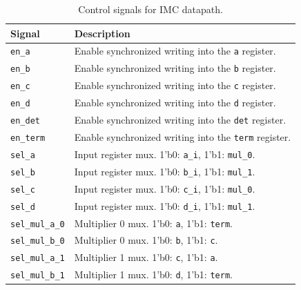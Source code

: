 \documentclass[../main.tex]{subfiles}
\begin{document}
\begin{table}[h]
    \centering
    \renewcommand{\arraystretch}{1.2}
    \setlength{\tabcolsep}{8pt}

    \begin{tabularx}{\textwidth}{@{}lX@{}}
        \toprule
        \textbf{Signal} & \textbf{Description} \\
        \midrule
        \texttt{en\_a}          & Enable synchronized writing into the \texttt{a} register. \\
        \texttt{en\_b}          & Enable synchronized writing into the \texttt{b} register. \\
        \texttt{en\_c}          & Enable synchronized writing into the \texttt{c} register. \\
        \texttt{en\_d}          & Enable synchronized writing into the \texttt{d} register. \\
        \texttt{en\_det}        & Enable synchronized writing into the \texttt{det} register. \\
        \texttt{en\_term}       & Enable synchronized writing into the \texttt{term} register. \\
        \texttt{sel\_a}         & Input register mux. 1'b0: \texttt{a\_i}, \hspace{20pt} 1'b1: \texttt{mul\_0}. \\
        \texttt{sel\_b}         & Input register mux. 1'b0: \texttt{b\_i}, \hspace{20pt} 1'b1: \texttt{mul\_1}. \\
        \texttt{sel\_c}         & Input register mux. 1'b0: \texttt{c\_i}, \hspace{20pt} 1'b1: \texttt{mul\_0}. \\
        \texttt{sel\_d}         & Input register mux. 1'b0: \texttt{d\_i}, \hspace{20pt} 1'b1: \texttt{mul\_1}. \\
        \texttt{sel\_mul\_a\_0} & Multiplier 0 mux. \hspace{5pt} 1'b0: \texttt{a}, \hspace{35pt} 1'b1: \texttt{term}. \\
        \texttt{sel\_mul\_b\_0} & Multiplier 0 mux. \hspace{5pt} 1'b0: \texttt{b}, \hspace{35pt} 1'b1: \texttt{c}. \\
        \texttt{sel\_mul\_a\_1} & Multiplier 1 mux. \hspace{5pt} 1'b0: \texttt{c}, \hspace{35pt} 1'b1: \texttt{a}. \\
        \texttt{sel\_mul\_b\_1} & Multiplier 1 mux. \hspace{5pt} 1'b0: \texttt{d}, \hspace{35pt} 1'b1: \texttt{term}. \\
        \bottomrule
    \end{tabularx}

    \caption{Control signals for IMC datapath.}
    \label{tab:q1_control}
\end{table}
\end{document}
